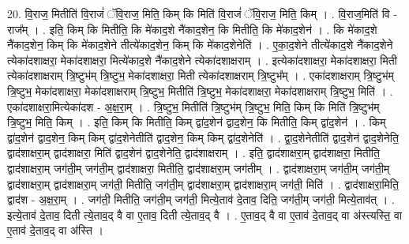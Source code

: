 \documentclass[17pt]{extarticle}
\begin{document}
20. वि॒राज॒ मितीति॑ वि॒राजं॑ ॅवि॒राज॒ मिति॒ किम् कि मिति॑ वि॒राजं॑ ॅवि॒राज॒ मिति॒ किम् । . वि॒राज॒मिति॑ वि - राज᳚म् । . इति॒ किम् कि मितीति॒ कि मे॑काद॒शे नै॑काद॒शेन॒ कि मितीति॒ कि मे॑काद॒शेन॑ । . कि मे॑काद॒शे नै॑काद॒शेन॒ किम् कि मे॑काद॒शेने तीत्ये॑काद॒शेन॒ किम् कि मे॑काद॒शेनेति॑ । . ए॒का॒द॒शेने तीत्ये॑काद॒शे नै॑काद॒शेने त्येका॑दशाक्षरा॒ मेका॑दशाक्षरा॒ मित्ये॑काद॒शे नै॑काद॒शेने त्येका॑दशाक्षराम् । . इत्येका॑दशाक्षरा॒ मेका॑दशाक्षरा॒ मिती त्येका॑दशाक्षराम् त्रि॒ष्टुभ॑म् त्रि॒ष्टुभ॒ मेका॑दशाक्षरा॒ मिती त्येका॑दशाक्षराम् त्रि॒ष्टुभ᳚म् । . एका॑दशाक्षराम् त्रि॒ष्टुभ॑म् त्रि॒ष्टुभ॒ मेका॑दशाक्षरा॒ मेका॑दशाक्षराम् त्रि॒ष्टुभ॒ मितीति॑ त्रि॒ष्टुभ॒ मेका॑दशाक्षरा॒ मेका॑दशाक्षराम् त्रि॒ष्टुभ॒ मिति॑ । . एका॑दशाक्षरा॒मित्येका॑दश - अ॒क्ष॒रा॒म् । . त्रि॒ष्टुभ॒ मितीति॑ त्रि॒ष्टुभ॑म् त्रि॒ष्टुभ॒ मिति॒ किम् कि मिति॑ त्रि॒ष्टुभ॑म् त्रि॒ष्टुभ॒ मिति॒ किम् । . इति॒ किम् कि मितीति॒ किम् द्वा॑द॒शेन॑ द्वाद॒शेन॒ कि मितीति॒ किम् द्वा॑द॒शेन॑ । . किम् द्वा॑द॒शेन॑ द्वाद॒शेन॒ किम् किम् द्वा॑द॒शेनेतीति॑ द्वाद॒शेन॒ किम् किम् द्वा॑द॒शेनेति॑ । . द्वा॒द॒शेनेतीति॑ द्वाद॒शेन॑ द्वाद॒शेनेति॒ द्वाद॑शाक्षरा॒म् द्वाद॑शाक्षरा॒ मिति॑ द्वाद॒शेन॑ द्वाद॒शेनेति॒ द्वाद॑शाक्षराम् । . इति॒ द्वाद॑शाक्षरा॒म् द्वाद॑शाक्षरा॒ मितीति॒ द्वाद॑शाक्षरा॒म् जग॑ती॒म् जग॑ती॒म् द्वाद॑शाक्षरा॒ मितीति॒ द्वाद॑शाक्षरा॒म् जग॑तीम् । . द्वाद॑शाक्षरा॒म् जग॑ती॒म् जग॑ती॒म् द्वाद॑शाक्षरा॒म् द्वाद॑शाक्षरा॒म् जग॑ती॒ मितीति॒ जग॑ती॒म् द्वाद॑शाक्षरा॒म् द्वाद॑शाक्षरा॒म् जग॑ती॒ मिति॑ । . द्वाद॑शाक्षरा॒मिति॒ द्वाद॑श - अ॒क्ष॒रा॒म् । . जग॑ती॒ मितीति॒ जग॑ती॒म् जग॑ती॒ मित्ये॒ताव॑ दे॒ताव॒ दिति॒ जग॑ती॒म् जग॑ती॒ मित्ये॒ताव॑त् । . इत्ये॒ताव॑ दे॒ताव॒ दिती त्ये॒ताव॒द् वै वा ए॒ताव॒ दिती त्ये॒ताव॒द् वै । . ए॒ताव॒द् वै वा ए॒ताव॑ दे॒ताव॒द् वा अ॑स्त्यस्ति॒ वा ए॒ताव॑ दे॒ताव॒द् वा अ॑स्ति । \newline
\end{document}
